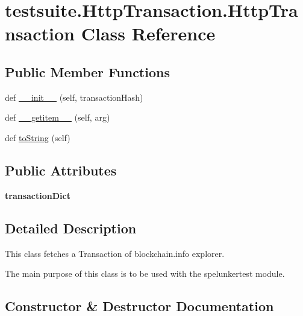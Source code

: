 \hypertarget{classtestsuite_1_1HttpTransaction_1_1HttpTransaction}{}\section{testsuite.\+Http\+Transaction.\+Http\+Transaction Class Reference}
\label{classtestsuite_1_1HttpTransaction_1_1HttpTransaction}
\subsection*{Public Member Functions}
\begin{DoxyCompactItemize}
\item 
def \hyperlink{classtestsuite_1_1HttpTransaction_1_1HttpTransaction_a5ae537b8cc5c42dd5208d200c4e9a9b8}{\+\_\+\+\_\+init\+\_\+\+\_\+} (self, transaction\+Hash)
\item 
def \hyperlink{classtestsuite_1_1HttpTransaction_1_1HttpTransaction_a8079981f5811b710e4d70998d78e7b3a}{\+\_\+\+\_\+getitem\+\_\+\+\_\+} (self, arg)
\item 
def \hyperlink{classtestsuite_1_1HttpTransaction_1_1HttpTransaction_a665cf0070f42c32dd470e88705acff5a}{to\+String} (self)
\end{DoxyCompactItemize}
\subsection*{Public Attributes}
\begin{DoxyCompactItemize}
\item 
\hypertarget{classtestsuite_1_1HttpTransaction_1_1HttpTransaction_a7953ab3026b8cfec7f6a35dd0be57d08}{}{\bfseries transaction\+Dict}\label{classtestsuite_1_1HttpTransaction_1_1HttpTransaction_a7953ab3026b8cfec7f6a35dd0be57d08}

\end{DoxyCompactItemize}


\subsection{Detailed Description}
\begin{DoxyVerb}This class fetches a Transaction of blockchain.info explorer.

The main purpose of this class is to be used with the spelunkertest module.
\end{DoxyVerb}
 

\subsection{Constructor \& Destructor Documentation}
\hypertarget{classtestsuite_1_1HttpTransaction_1_1HttpTransaction_a5ae537b8cc5c42dd5208d200c4e9a9b8}{}
